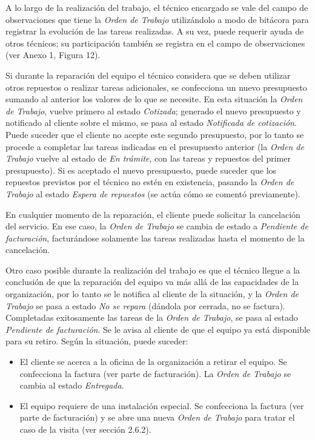 \documentclass[12pt]{extarticle}
\begin{document}
\begin{spacing}{1.2}
    A lo largo de la realización del trabajo, el técnico encargado se vale del campo de observaciones que tiene la \textit{Orden de Trabajo} utilizándolo a modo de bitácora para registrar la evolución de las tareas realizadas. A su vez, puede requerir ayuda de otros técnicos; su participación también se registra en el campo de observaciones (ver Anexo 1, Figura 12). 
    
    Si durante la reparación del equipo el técnico considera que se deben utilizar otros repuestos o realizar tareas adicionales, se confecciona un nuevo presupuesto sumando al anterior los valores de lo que se necesite. En esta situación la \textit{Orden de Trabajo}, vuelve primero al estado \textit{Cotizada}; generado el nuevo presupuesto y notificado al cliente sobre el mismo, se pasa al estado \textit{Notificada de cotización}. Puede suceder que el cliente no acepte este segundo presupuesto, por lo tanto se procede a completar las tareas indicadas en el presupuesto anterior (la \textit{Orden de Trabajo} vuelve al estado de \textit{En trámite}, con las tareas y repuestos del primer presupuesto). Si es aceptado el nuevo presupuesto, puede suceder que los repuestos previstos por el técnico no estén en existencia, pasando la \textit{Orden de Trabajo} al estado \textit{Espera de repuestos} (se actúa cómo se comentó previamente).
    
    En cualquier momento de la reparación, el cliente puede solicitar la cancelación del servicio. En ese caso, la \textit{Orden de Trabajo} se cambia de estado a \textit{Pendiente de facturación}, facturándose solamente las tareas realizadas hasta el momento de la cancelación.
    
    Otro caso posible durante la realización del trabajo es que el técnico llegue a la conclusión de que la reparación del equipo va más allá de las capacidades de la organización, por lo tanto se le notifica al cliente de la situación, y la \textit{Orden de Trabajo} se pasa a estado \textit{No se repara} (dándola por cerrada, no se factura).\\

    Completadas exitosamente las tareas de la \textit{Orden de Trabajo}, se pasa al estado \textit{Pendiente de facturación}. Se le avisa al cliente de que el equipo ya está disponible para su retiro. Según la situación, puede suceder:
    \begin{itemize}
        \item El cliente se acerca a la oficina de la organización a retirar el equipo. Se confecciona la factura (ver parte de facturación). La \textit{Orden de Trabajo} se cambia al estado \textit{Entregada}.
        \item El equipo requiere de una instalación especial. Se confecciona la factura (ver parte de facturación) y se abre una nueva \textit{Orden de Trabajo} para tratar el caso de la visita (ver sección 2.6.2).
    \end{itemize}


\end{spacing}
\end{document}
